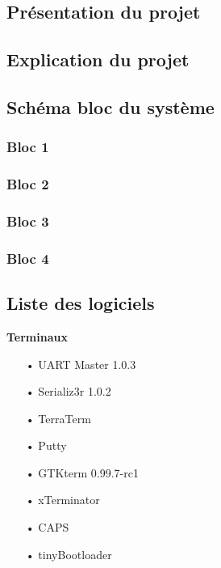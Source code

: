 \documentclass[10pt,a4paper,final]{article}
\begin{document}
\renewcommand\footrulewidth{1pt}
\fancyfoot[R]{\today}
\begin{spacing}{1.5}

\section{Présentation du projet}

\subsection{Explication du projet}

\subsection{Schéma bloc du système}
\subsubsection{Bloc 1}

\subsubsection{Bloc 2}

\subsubsection{Bloc 3}

\subsubsection{Bloc 4}

\subsection{Liste des logiciels}
\begin{flushleft}
\HRule
\end{flushleft}
\begin{flushleft}

\begin{multicols}{3}

\textbf{Terminaux}
\begin{itemize}
\item[•]UART Master 1.0.3
\item[•]Serializ3r 1.0.2
\item[•]TerraTerm
\item[•]Putty
\item[•]GTKterm 0.99.7-rc1
\item[•]xTerminator
\item[•]CAPS
\item[•]tinyBootloader
\end{itemize}


\end{multicols}
\end{flushleft}
\end{spacing}
\end{document}
